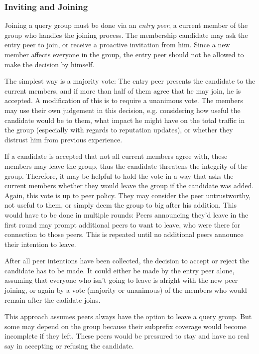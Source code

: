 \subsubsection{Inviting and Joining}
Joining a query group must be done via an \emph{entry peer}, a current member of
the group who handles the joining process. The membership candidate may ask the
entry peer to join, or receive a proactive invitation from him. Since a new
member affects everyone in the group, the entry peer should not be allowed to
make the decision by himself.

The simplest way is a majority vote: The entry peer presents the candidate to
the current members, and if more than half of them agree that he may join, he is
accepted. A modification of this is to require a unanimous vote. The members may
use their own judgement in this decision, e.g. considering how useful the
candidate would be to them, what impact he might have on the total traffic in
the group (especially with regards to reputation updates), or whether they
distrust him from previous experience.

If a candidate is accepted that not all current members agree with, these
members may leave the group, thus the candidate threatens the integrity of the
group. Therefore, it may be helpful to hold the vote in a way that asks the
current members whether they would leave the group if the candidate was added.
Again, this vote is up to peer policy. They may consider the peer untrustworthy,
not useful to them, or simply deem the group to big after his addition.
This would have to be done in multiple rounds: Peers announcing they'd leave in
the first round may prompt additional peers to want to leave, who were there
for connection to those peers. This is repeated until no additional peers
announce their intention to leave.

After all peer intentions have been collected, the decision to accept or reject
the candidate has to be made. It could either be made by the entry peer alone,
assuming that everyone who isn't going to leave is alright with the new peer
joining, or again by a vote (majority or unanimous) of the members who would
remain after the cadidate joins.

This approach assumes peers always have the option to leave a query group. But
some may depend on the group because their subprefix coverage would become
incomplete if they left. These peers would be pressured to stay and have no real
say in accepting or refusing the candidate.

